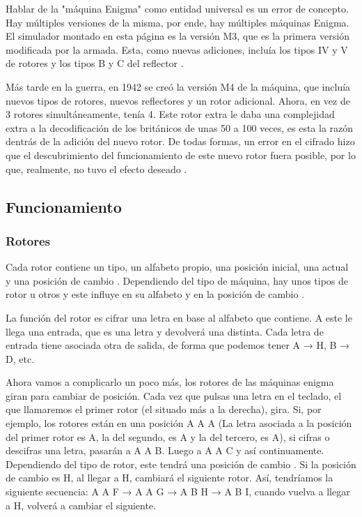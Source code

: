 Hablar de la "máquina Enigma" como entidad universal es un error de concepto. Hay múltiples versiones de la misma, por ende, hay múltiples máquinas Enigma. El simulador montado en esta página es la versión M3, que es la primera versión modificada por la armada. Esta, como nuevas adiciones, incluía los tipos IV y V de rotores y los tipos B y C del reflector \cite{wiki_enigma_rotor}.

Más tarde en la guerra, en 1942 se creó la versión M4 de la máquina, que incluía nuevos tipos de rotores, nuevos reflectores y un rotor adicional. Ahora, en vez de 3 rotores simultáneamente, tenía 4. Este rotor extra le daba una complejidad extra a la decodificación de los británicos de unas 50 a 100 veces, es esta la razón dentrás de la adición del nuevo rotor. De todas formas, un error en el cifrado hizo que el descubrimiento del funcionamiento de este nuevo rotor fuera posible, por lo que, realmente, no tuvo el efecto deseado \cite{cryptomuseum_enigma}.

\subsection {Funcionamiento}
\subsubsection {Rotores}

Cada rotor contiene un tipo, un alfabeto propio, una posición inicial,
una actual y una posición de cambio \cite{wiki_enigma_rotor}. Dependiendo del tipo de máquina,
hay unos tipos de rotor u otros y este influye en su alfabeto y en la posición de cambio \cite{wiki_enigma_rotor}.


La función del rotor es cifrar una letra en base al alfabeto que contiene.
A este le llega una entrada, que es una letra y devolverá una distinta.
Cada letra de entrada tiene asociada otra de salida, de forma que podemos tener A → H, B → D, etc.


Ahora vamos a complicarlo un poco más, los rotores de las máquinas enigma giran para cambiar de posición.
Cada vez que pulsas una letra en el teclado, el que llamaremos el primer rotor (el situado más a la derecha), gira.
Si, por ejemplo, los rotores están en una posición A A A
(La letra asociada a la posición del primer rotor es A, la del segundo, es A y la del tercero, es A),
si cifras o descifras una letra, pasarán a A A B. Luego a A A C y así continuamente.
Dependiendo del tipo de rotor, este tendrá una posición de cambio \cite{wiki_enigma_rotor}. Si la posición de cambio es H,
al llegar a H, cambiará el siguiente rotor. Así, tendríamos la siguiente secuencia:
A A F → A A G → A B H → A B I, cuando vuelva a llegar a H, volverá a cambiar el siguiente.


